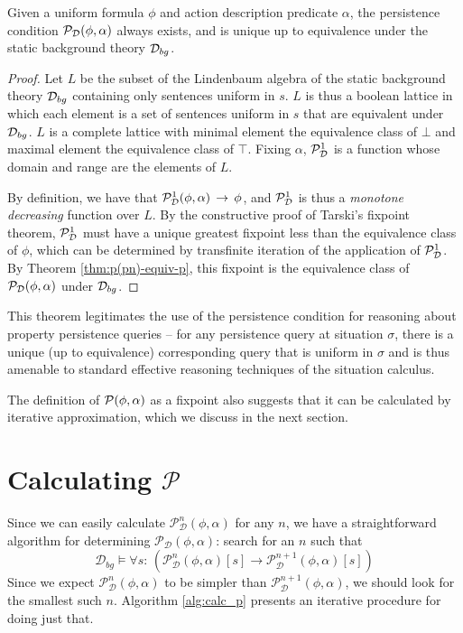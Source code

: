 \begin{thm}
Given a uniform formula $\phi$ and action description predicate $\alpha$,
the persistence condition $\mathcal{P}_{\mathcal{D}}(\phi,\alpha)$ always exists,
and is unique up to equivalence under the static background theory
$\mathcal{D}_{bg}$. \label{thm:p-always-exists} 
\end{thm}
\begin{proof}
Let $L$ be the subset of the Lindenbaum algebra of the static background
theory $\mathcal{D}_{bg}$ containing only sentences uniform in $s$. $L$
is thus a boolean lattice in which each element is a set of sentences
uniform in $s$ that are equivalent under $\mathcal{D}_{bg}$. $L$ is a complete
lattice with minimal element the equivalence class of $\bot$ and
maximal element the equivalence class of $\top$. Fixing $\alpha$,
$\mathcal{P}^{1}_{\mathcal{D}}$ is a function whose domain and range are the elements of
$L$.

By definition, we have that $\mathcal{P}^{1}_{\mathcal{D}}(\phi,\alpha)\,\rightarrow\,\phi$,
and $\mathcal{P}^{1}_{\mathcal{D}}$ is thus a \emph{monotone decreasing} function over $L$.
By the constructive proof of Tarski's fixpoint theorem, $\mathcal{P}^{1}_{\mathcal{D}}$
must have a unique greatest fixpoint less than the equivalence class
of $\phi$, which can be determined by transfinite iteration of the
application of $\mathcal{P}^{1}_{\mathcal{D}}$. By Theorem \ref{thm:p(pn)-equiv-p}, this
fixpoint is the equivalence class of $\mathcal{P}_{\mathcal{D}}(\phi,\alpha)$ under
$\mathcal{D}_{bg}$. 
\end{proof}
This theorem legitimates the use of the persistence condition for
reasoning about property persistence queries -- for any persistence
query at situation $\sigma$, there is a unique (up to equivalence)
corresponding query that is uniform in $\sigma$ and is thus amenable
to standard effective reasoning techniques of the situation calculus.

The definition of $\mathcal{P}(\phi,\alpha)$ as a fixpoint also suggests
that it can be calculated by iterative approximation, which we discuss
in the next section.


\section{Calculating $\mathcal{P}$\label{sec:Persistence:Calculating}}

Since we can easily calculate $\mathcal{P}_{\mathcal{D}}^{n}(\phi,\alpha)$
for any $n$, we have a straightforward algorithm for determining
$\mathcal{P_{D}}(\phi,\alpha)$: search for an $n$ such that\[
\mathcal{D}_{bg}\models\forall s:\,\left(\mathcal{P}_{\mathcal{D}}^{n}(\phi,\alpha)[s]\rightarrow\mathcal{P}_{\mathcal{D}}^{n+1}(\phi,\alpha)[s]\right)\]
 Since we expect $\mathcal{P}_{\mathcal{D}}^{n}(\phi,\alpha)$ to
be simpler than $\mathcal{P}_{\mathcal{D}}^{n+1}(\phi,\alpha)$, we
should look for the smallest such $n$. Algorithm \ref{alg:calc_p}
presents an iterative procedure for doing just that.

